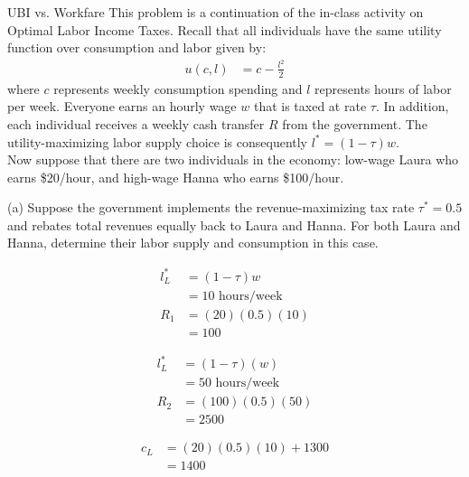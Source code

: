 \documentclass[10pt]{extarticle}
\title{}
\author{}
\date{}
\begin{document}
  \begin{problem}{UBI vs. Workfare}
    This problem is a continuation of the in-class activity on Optimal Labor Income Taxes. Recall that all individuals have the same utility function over consumption and labor given by:
    \begin{align*}
      u(c,l) &= c-\frac{l^2}{2}
    \end{align*}
    where $c$ represents weekly consumption spending and $l$ represents hours of labor per week. Everyone earns an hourly wage $w$ that is taxed at rate $\tau$. In addition, each individual receives a weekly cash transfer $R$ from the government. The utility-maximizing labor supply choice is consequently $l^{\ast} = (1-\tau)w$.\\

    Now suppose that there are two individuals in the economy: low-wage Laura who earns \$20/hour, and high-wage Hanna who earns \$100/hour.
    \begin{problem}{(a)}
      Suppose the government implements the revenue-maximizing tax rate $\tau^{\ast} = 0.5$ and rebates total revenues equally back to Laura and Hanna. For both Laura and Hanna, determine their labor supply and consumption in this case.
      \tcblower
      \begin{description}[font=\normalfont]
        \item[Laura's Labor Supply:]
          \begin{align*}
            l^{\ast}_{L} &= (1-\tau)w\\
                     &= 10\text{ hours/week}\\
            R_1 &= (20)(0.5)(10)\\
                &= 100
          \end{align*}
        \item[Hanna's Labor Supply:]
          \begin{align*}
            l^{\ast}_{L} &= (1-\tau)(w)\\
                         &= 50\text{ hours/week}\\
            R_2 &= (100)(0.5)(50)\\
                &= 2500
          \end{align*}
        \item[Consumption:]
          \begin{align*}
            c_{L} &= (20)(0.5)(10) + 1300\\
                  &= 1400\\

\end{align*}
\end{description}
\end{problem}
\end{problem}
\end{document}
